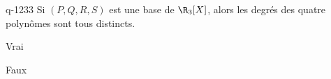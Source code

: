 \begin{truefalse}{q-1233}
Si $(P,Q,R,S)$ est une base de $\R_3[X]$, alors les degrés des quatre polynômes sont tous distincts.
\item Vrai
\item* Faux
\end{truefalse}

